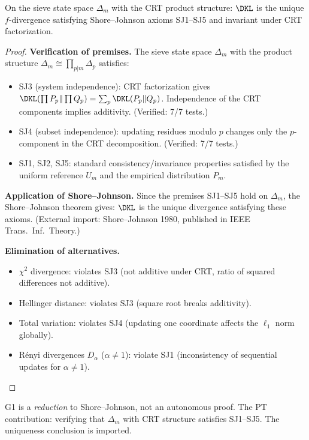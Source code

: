 \documentclass[12pt,a4paper]{article}
\begin{document}
\mTHM
\begin{theorem}
\label{thm:G1}
On the sieve state space $\Delta_m$ with the CRT product structure:
$\DKL$ is the unique $f$-divergence satisfying Shore--Johnson axioms
SJ1--SJ5 and invariant under CRT factorization.

\begin{proof}
\textbf{Verification of premises.} The sieve state space $\Delta_m$
with the product structure $\Delta_m \cong \prod_{p|m} \Delta_p$ satisfies:
\begin{itemize}
\item SJ3 (system independence): CRT factorization gives $\DKL(\prod P_p \| \prod Q_p)
  = \sum_p \DKL(P_p \| Q_p)$. Independence of the CRT components implies
  additivity. (Verified: 7/7 tests.)
\item SJ4 (subset independence): updating residues modulo $p$ changes only the
  $p$-component in the CRT decomposition. (Verified: 7/7 tests.)
\item SJ1, SJ2, SJ5: standard consistency/invariance properties satisfied by
  the uniform reference $U_m$ and the empirical distribution $P_m$.
\end{itemize}

\textbf{Application of Shore--Johnson.} Since the premises SJ1--SJ5 hold
on $\Delta_m$, the Shore--Johnson theorem gives: $\DKL$ is the unique
divergence satisfying these axioms. (External import: Shore--Johnson 1980,
published in IEEE Trans.\ Inf.\ Theory.)

\textbf{Elimination of alternatives.}
\begin{itemize}
\item $\chi^2$ divergence: violates SJ3 (not additive under CRT, ratio
  of squared differences not additive).
\item Hellinger distance: violates SJ3 (square root breaks additivity).
\item Total variation: violates SJ4 (updating one coordinate affects
  the $\ell_1$ norm globally).
\item R\'enyi divergences $D_\alpha$ ($\alpha \neq 1$): violate SJ1
  (inconsistency of sequential updates for $\alpha \neq 1$).
\end{itemize}
\end{proof}
\end{theorem}

\begin{remark}[Scope of G1]
G1 is a \emph{reduction} to Shore--Johnson, not an autonomous proof.
The PT contribution: verifying that $\Delta_m$ with CRT structure
satisfies SJ1--SJ5. The uniqueness conclusion is imported.
\end{remark}
\end{document}
